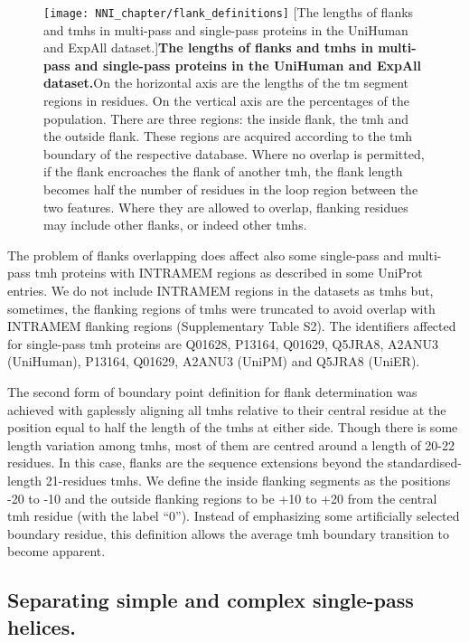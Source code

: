\begin{figure}[!ht]
\centering
\texttt{[image: NNI\_chapter/flank\_definitions]}
[The lengths of flanks and \gls{tmh}s in multi-pass and single-pass proteins in the UniHuman and ExpAll dataset.]{\textbf{The lengths of flanks and \gls{tmh}s in multi-pass and single-pass proteins in the UniHuman and ExpAll dataset.}On the horizontal axis are the lengths of the \gls{tm} segment regions in residues.
On the vertical axis are the percentages of the population.
There are three regions: the inside flank, the \gls{tmh} and the outside flank.
These regions are acquired according to the \gls{tmh} boundary of the respective database.
Where no overlap is permitted, if the flank encroaches the flank of another \gls{tmh}, the flank length becomes half the number of residues in the loop region between the two features.
Where they are allowed to overlap, flanking residues may include other flanks, or indeed other \gls{tmh}s.}

\label{fig:flank_definitions}
\end{figure}

The problem of flanks overlapping does affect also some single-pass and multi-pass \gls{tmh} proteins with INTRAMEM regions as described in some UniProt entries.
We do not include INTRAMEM regions in the datasets as \gls{tmh}s but, sometimes, the flanking regions of \gls{tmh}s were truncated to avoid overlap with INTRAMEM flanking regions (Supplementary Table S2).
 The identifiers affected for single-pass \gls{tmh} proteins are Q01628, P13164, Q01629, Q5JRA8, A2ANU3 (UniHuman), P13164, Q01629, A2ANU3 (UniPM) and Q5JRA8 (UniER).

The second form of boundary point definition for flank determination was achieved with gaplessly aligning all \gls{tmh}s relative to their central residue at the position equal to half the length of the \gls{tmh}s at either side.
Though there is some length variation among \gls{tmh}s, most of them are centred around a length of 20-22 residues.
In this case, flanks are the sequence extensions beyond the standardised-length 21-residues \gls{tmh}s.
We define the inside flanking segments as the positions -20 to -10 and the outside flanking regions to be +10 to +20 from the central \gls{tmh} residue (with the label ``0'').
Instead of emphasizing some artificially selected boundary residue, this definition allows the average \gls{tmh} boundary transition to become apparent.

\subsection{Separating simple and complex single-pass helices.}


